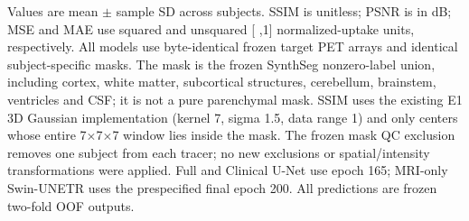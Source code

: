 \documentclass{article}
\providecommand{\DIFaddtex}[1]{{\protect\color{blue} \sf #1}} %
\providecommand{\DIFaddFL}[1]{\DIFadd{#1}} %
\providecommand{\DIFadd}[1]{\texorpdfstring{\DIFaddtex{#1}}{#1}} %
\begin{document}
\begin{table}[t]
\centering
\caption{Mask-restricted quality of frozen two-fold OOF PET predictions.}
\label{tab:r3_11_masked_summary}
\par\smallskip
\begin{minipage}{\textwidth}\footnotesize
\DIFaddFL{Values are mean $\pm$ sample SD across subjects. SSIM is unitless; PSNR is in dB; MSE and MAE use squared and unsquared }[\DIFaddFL{0,1}] \DIFaddFL{normalized-uptake units, respectively. All models use byte-identical frozen target PET arrays and identical subject-specific masks. The mask is the frozen SynthSeg nonzero-label union, including cortex, white matter, subcortical structures, cerebellum, brainstem, ventricles and CSF; it is not a pure parenchymal mask. SSIM uses the existing E1 3D Gaussian implementation (kernel 7, sigma 1.5, data range 1) and only centers whose entire 7$\times$7$\times$7 window lies inside the mask. The frozen mask QC exclusion removes one subject from each tracer; no new exclusions or spatial/intensity transformations were applied. Full and Clinical U-Net use epoch 165; MRI-only Swin-UNETR uses the prespecified final epoch 200. All predictions are frozen two-fold OOF outputs.
}\end{minipage}
\end{table}
\end{document}
